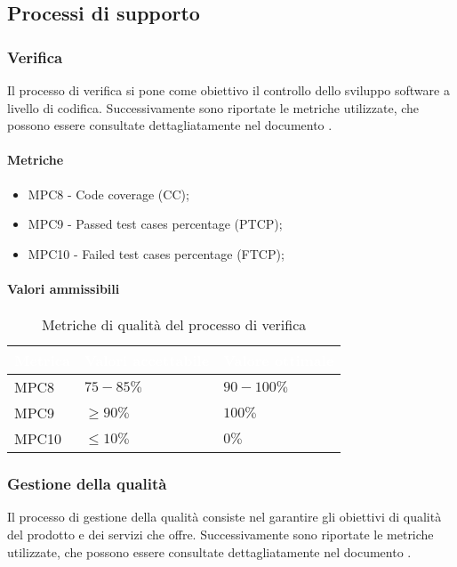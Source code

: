 \subsection{Processi di supporto}



\subsubsection{Verifica}
Il processo di verifica si pone come obiettivo il controllo dello sviluppo software a livello di codifica. Successivamente sono riportate le metriche utilizzate, che possono essere consultate dettagliatamente nel documento .

\paragraph{Metriche}

\begin{itemize}
\item MPC8 - Code coverage (CC);
\item MPC9 - Passed test cases percentage (PTCP);
\item MPC10 - Failed test cases percentage (FTCP);
 
\end{itemize}

\paragraph{Valori ammissibili}
{
\renewcommand{\arraystretch}{1.5}
\centering
\begin{longtable}{C{2.5cm} C{4cm} C{4cm}}
\textcolor{white}{\textbf{Metrica}}&
\textcolor{white}{\textbf{Valori accettabile}}&
\textcolor{white}{\textbf{Valore ottimale}}\\	
\endhead
\endfoot
{}\caption{Metriche di qualità del processo di verifica}
\endlastfoot

MPC8 & $ 75-85\% $  & $ 90-100 \% $ \\
MPC9 & $ \geq 90\% $  & $ 100 \% $ \\
MPC10 & $ \leq 10\% $  & $ 0 \% $ \\

\end{longtable}
}



\subsubsection{Gestione della qualità}
Il processo di gestione della qualità consiste nel garantire gli obiettivi di qualità del prodotto e dei servizi che offre. Successivamente sono riportate le metriche utilizzate, che possono essere consultate dettagliatamente nel documento .

